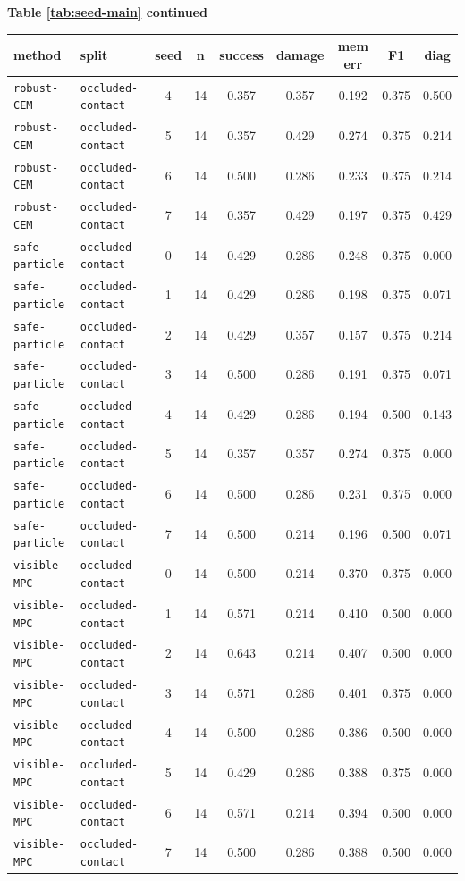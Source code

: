 \documentclass{article}
\begin{document}
\begin{center}
\textbf{Table \ref{tab:seed-main} continued}\\[0.4ex]
\begin{tabular}{llccccccc}
\toprule
method & split & seed & n & success & damage & mem err & F1 & diag \\
\midrule
\texttt{robust-CEM} & \texttt{occluded-contact} & 4 & 14 & 0.357 & 0.357 & 0.192 & 0.375 & 0.500 \\
\texttt{robust-CEM} & \texttt{occluded-contact} & 5 & 14 & 0.357 & 0.429 & 0.274 & 0.375 & 0.214 \\
\texttt{robust-CEM} & \texttt{occluded-contact} & 6 & 14 & 0.500 & 0.286 & 0.233 & 0.375 & 0.214 \\
\texttt{robust-CEM} & \texttt{occluded-contact} & 7 & 14 & 0.357 & 0.429 & 0.197 & 0.375 & 0.429 \\
\texttt{safe-particle} & \texttt{occluded-contact} & 0 & 14 & 0.429 & 0.286 & 0.248 & 0.375 & 0.000 \\
\texttt{safe-particle} & \texttt{occluded-contact} & 1 & 14 & 0.429 & 0.286 & 0.198 & 0.375 & 0.071 \\
\texttt{safe-particle} & \texttt{occluded-contact} & 2 & 14 & 0.429 & 0.357 & 0.157 & 0.375 & 0.214 \\
\texttt{safe-particle} & \texttt{occluded-contact} & 3 & 14 & 0.500 & 0.286 & 0.191 & 0.375 & 0.071 \\
\texttt{safe-particle} & \texttt{occluded-contact} & 4 & 14 & 0.429 & 0.286 & 0.194 & 0.500 & 0.143 \\
\texttt{safe-particle} & \texttt{occluded-contact} & 5 & 14 & 0.357 & 0.357 & 0.274 & 0.375 & 0.000 \\
\texttt{safe-particle} & \texttt{occluded-contact} & 6 & 14 & 0.500 & 0.286 & 0.231 & 0.375 & 0.000 \\
\texttt{safe-particle} & \texttt{occluded-contact} & 7 & 14 & 0.500 & 0.214 & 0.196 & 0.500 & 0.071 \\
\texttt{visible-MPC} & \texttt{occluded-contact} & 0 & 14 & 0.500 & 0.214 & 0.370 & 0.375 & 0.000 \\
\texttt{visible-MPC} & \texttt{occluded-contact} & 1 & 14 & 0.571 & 0.214 & 0.410 & 0.500 & 0.000 \\
\texttt{visible-MPC} & \texttt{occluded-contact} & 2 & 14 & 0.643 & 0.214 & 0.407 & 0.500 & 0.000 \\
\texttt{visible-MPC} & \texttt{occluded-contact} & 3 & 14 & 0.571 & 0.286 & 0.401 & 0.375 & 0.000 \\
\texttt{visible-MPC} & \texttt{occluded-contact} & 4 & 14 & 0.500 & 0.286 & 0.386 & 0.500 & 0.000 \\
\texttt{visible-MPC} & \texttt{occluded-contact} & 5 & 14 & 0.429 & 0.286 & 0.388 & 0.375 & 0.000 \\
\texttt{visible-MPC} & \texttt{occluded-contact} & 6 & 14 & 0.571 & 0.214 & 0.394 & 0.500 & 0.000 \\
\texttt{visible-MPC} & \texttt{occluded-contact} & 7 & 14 & 0.500 & 0.286 & 0.388 & 0.500 & 0.000 \\
\bottomrule
\end{tabular}
\end{center}
\normalsize
\end{document}
